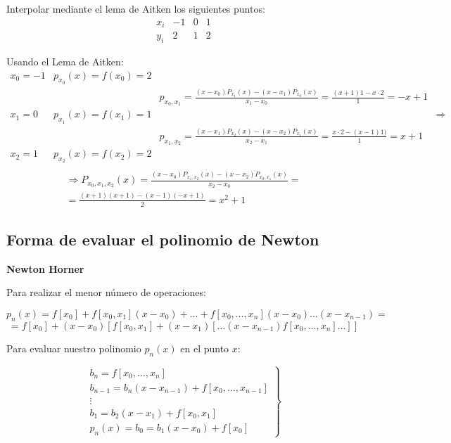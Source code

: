\begin{ejemplo}
    Interpolar mediante el lema de Aitken los siguientes puntos:
    \begin{equation*}
        \begin{array}{c|ccc}
            x_i & -1 & 0 & 1 \\ \hline
            y_i & 2 & 1 & 2
        \end{array}
    \end{equation*}

    Usando el Lema de Aitken:
    \begin{equation*}
        \begin{array}{c|ccc}
            x_0=-1 & p_{x_0}(x)=f(x_0)=2 \\
            && p_{x_0,x_1} = \frac{(x-x_0)P_{x_1}(x)-(x-x_1)P_{x_0}(x)}{x_1-x_0} = \frac{(x+1)1 - x\cdot 2}{1} = -x+1\\
            x_1=0 & p_{x_1}(x)=f(x_1)=1 & & \Longrightarrow \\
            && p_{x_1,x_2} = \frac{(x-x_1)P_{x_2}(x)-(x-x_2)P_{x_1}(x)}{x_2-x_1} = \frac{x\cdot 2 - (x-1)1)}{1} = x+1\\
            x_2=1 & p_{x_2}(x)=f(x_2)=2 \\
        \end{array}
    \end{equation*}
    \begin{multline*}
        \Longrightarrow P_{x_0, x_1, x_2}(x) = \frac{(x-x_0)P_{x_1,x_2}(x) - (x-x_2)P_{x_0,x_1}(x)}{x_2-x_0} =\\= \frac{(x+1)(x+1)-(x-1)(-x+1)}{2} = x^2+1
    \end{multline*}
\end{ejemplo}
\subsection{Forma de evaluar el polinomio de Newton}
\textbf{Newton Horner}\par
Para realizar el menor número de operaciones:

$$p_n(x) = f[x_0] + f[x_0,x_1](x-x_0) + \ldots + f[x_0,\ldots ,x_n](x-x_0)\ldots(x-x_{n-1}) = $$
$$=f[x_0] + (x-x_0) [f[x_0,x_1] + (x-x_1)[\ldots (x-x_{n-1}) f[x_0, \ldots, x_n] \ldots ]]$$

\bigskip
Para evaluar nuestro polinomio $p_n(x)$ en el punto $x$:

$$\left.\begin{array}{l}
        b_n = f[x_0, \ldots, x_n]                            \\
        b_{n-1} = b_n(x - x_{n-1}) + f[x_0, \ldots, x_{n-1}] \\
        \vdots                                               \\
        b_1 = b_2 (x-x_1) + f[x_0, x_1]                      \\
        p_n(x) = b_0 = b_1 (x-x_0) + f[x_0]
    \end{array}\right\}$$

